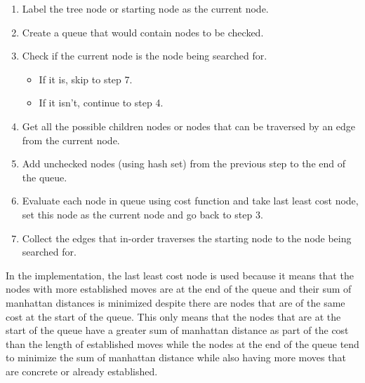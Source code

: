 \begin{enumerate}
\item Label the tree node or starting node as the current node.
\item Create a queue that would contain nodes to be checked.
\item Check if the current node is the node being searched for.
\begin{itemize}
  \item If it is, skip to step 7.
  \item If it isn't, continue to step 4.
\end{itemize}
\item Get all the possible children nodes or nodes that can be traversed by an edge from the current node.
\item Add unchecked nodes (using hash set) from the previous step to the end of the queue.
\item Evaluate each node in queue using cost function and take last least cost node, set this node as the current node and go back to step 3.
\item Collect the edges that in-order traverses the starting node to the node being searched for.
\end{enumerate}

\par In the implementation, the last least cost node is used because it means that the nodes with more established moves are at the end of the queue and their sum of manhattan distances is minimized despite there are nodes that are of the same cost at the start of the queue. This only means that the nodes that are at the start of the queue have a greater sum of manhattan distance as part of the cost than the length of established moves while the nodes at the end of the queue tend to minimize the sum of manhattan distance while also having more moves that are concrete or already established.

